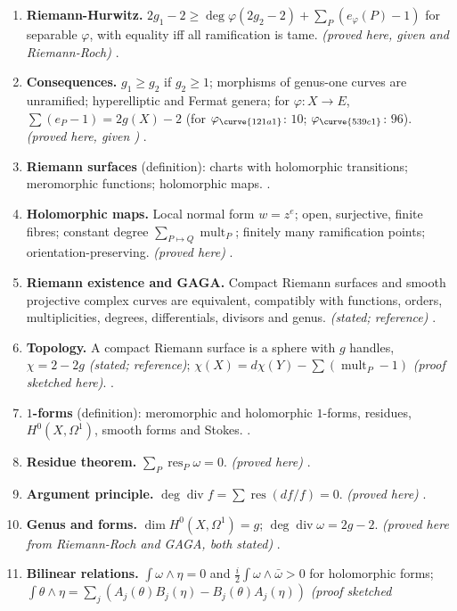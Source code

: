 \begin{enumerate}[label=\textbf{\thechapter.\arabic*}]
\item \textbf{Riemann-Hurwitz.} $2g_1-2\ge\deg\varphi(2g_2-2)+\sum_P(e_\varphi(P)-1)$ for separable $\varphi$, with equality iff all ramification is tame. \emph{(proved here, given  and Riemann-Roch)}
.
\item \textbf{Consequences.} $g_1\ge g_2$ if $g_2\ge1$; morphisms of genus-one curves are unramified; hyperelliptic and Fermat genera; for $\varphi\colon X\to E$, $\sum(e_P-1)=2g(X)-2$
(for $\varphi_{\curve{121a1}}$: $10$; $\varphi_{\curve{539c1}}$: $96$). \emph{(proved here, given )} .
\item \textbf{Riemann surfaces} (definition): charts with holomorphic transitions; meromorphic functions; holomorphic maps. .
\item \textbf{Holomorphic maps.} Local normal form $w=z^e$; open, surjective, finite fibres; constant degree $\sum_{P\mapsto Q}\operatorname{mult}_P$; finitely many ramification points;
orientation-preserving. \emph{(proved here)} .
\item \textbf{Riemann existence and GAGA.} Compact Riemann surfaces and smooth projective complex curves are equivalent, compatibly with functions, orders, multiplicities, degrees,
differentials, divisors and genus. \emph{(stated; reference)} .
\item \textbf{Topology.} A compact Riemann surface is a sphere with $g$ handles, $\chi=2-2g$ \emph{(stated; reference)}; $\chi(X)=d\chi(Y)-\sum(\operatorname{mult}_P-1)$ \emph{(proof sketched here)}.
.
\item \textbf{$1$-forms} (definition): meromorphic and holomorphic $1$-forms, residues, $H^0(X,\Omega^1)$, smooth forms and Stokes. .
\item \textbf{Residue theorem.} $\sum_P\operatorname{res}_P\omega=0$. \emph{(proved here)} .
\item \textbf{Argument principle.} $\deg\operatorname{div}f=\sum\operatorname{res}(df/f)=0$. \emph{(proved here)} .
\item \textbf{Genus and forms.} $\dim H^0(X,\Omega^1)=g$; $\deg\operatorname{div}\omega=2g-2$. \emph{(proved here from Riemann-Roch and GAGA, both stated)} .
\item \textbf{Bilinear relations.} $\int\omega\wedge\eta=0$ and $\frac i2\int\omega\wedge\bar\omega>0$ for holomorphic forms; $\int\theta\wedge\eta=\sum_j(A_j(\theta)B_j(\eta)-B_j(\theta)A_j(\eta))$ \emph{(proof sketched
}
\end{enumerate}
